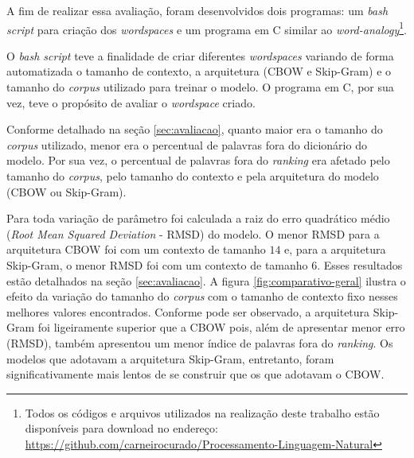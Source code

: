 \documentclass[12pt,openright,twoside,a4paper,article,brazil]{abntex2}
\begin{document}
A fim de realizar essa avaliação, foram desenvolvidos dois programas: um \emph{bash script} para criação dos \emph{wordspaces} e um programa em C similar ao \emph{word-analogy}\footnote{Todos os códigos e arquivos utilizados na realização deste trabalho estão disponíveis para download no endereço: \url{https://github.com/carneirocurado/Processamento-Linguagem-Natural}}.

O \emph{bash script} teve a finalidade de criar diferentes \emph{wordspaces} variando de forma automatizada o tamanho de contexto, a arquitetura (CBOW e Skip-Gram) e o tamanho do \emph{corpus} utilizado para treinar o modelo. O programa em C, por sua vez, teve o propósito de avaliar o \emph{wordspace} criado.

Conforme detalhado na seção \ref{sec:avaliacao}, quanto maior era o tamanho do \emph{corpus} utilizado, menor era o percentual de palavras fora do dicionário do modelo. Por sua vez, o percentual de palavras fora do \emph{ranking} era afetado pelo tamanho do \emph{corpus}, pelo tamanho do contexto e pela arquitetura do modelo (CBOW ou Skip-Gram).

Para toda variação de parâmetro foi calculada a raiz do erro quadrático médio (\emph{Root Mean Squared Deviation} - RMSD) do modelo. O menor RMSD para a arquitetura CBOW foi com um contexto de tamanho $14$ e, para a arquitetura Skip-Gram, o menor RMSD foi com um contexto de tamanho $6$. Esses resultados estão detalhados na seção \ref{sec:avaliacao}. A figura \ref{fig:comparativo-geral} ilustra o efeito da variação do tamanho do \emph{corpus} com o tamanho de contexto fixo nesses melhores valores encontrados. Conforme pode ser observado, a arquitetura Skip-Gram foi ligeiramente superior que a CBOW pois, além de apresentar menor erro (RMSD), também apresentou um menor índice de palavras fora do \emph{ranking}. Os modelos que adotavam a arquitetura Skip-Gram, entretanto, foram significativamente mais lentos de se construir que os que adotavam o CBOW.



\backmatter

\postextual

\newpage



\apendices

\lstset{breaklines=true,numbers=left,extendedchars=true}

\end{document}
